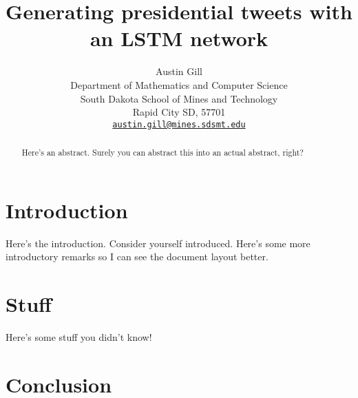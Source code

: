 \documentclass[letterpaper]{article}
\title{Generating presidential tweets with an LSTM network}
\author{
    Austin Gill\\
    Department of Mathematics and Computer Science\\
    South Dakota School of Mines and Technology\\
    Rapid City SD, 57701\\
    \texttt{\href{mailto:austin.gill@mines.sdsmt.edu}{austin.gill@mines.sdsmt.edu}} \\
}
\begin{document}
\maketitle

\begin{abstract}
    Here's an abstract. Surely you can abstract this into an actual abstract, right?
\end{abstract}

\section{Introduction}
    Here's the introduction. Consider yourself introduced. Here's some more introductory remarks so I can see the document layout better.


\section{Stuff}
    Here's some stuff you didn't know!

\section{Conclusion}
\end{document}

